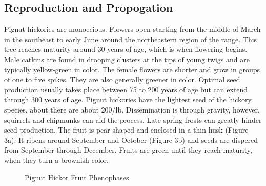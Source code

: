 \documentclass{article}\usepackage[]{graphicx}\usepackage[]{color}
\begin{document}
\subsection*{Reproduction and Propogation}
Pignut hickories are monoecious. Flowers open starting from the middle of March in the southeast to early June around the northeastern region of the range. This tree reaches maturity around 30 years of age, which is when flowering begins. Male catkins are found in drooping clusters at the tips of young twigs and are typically yellow-green in color. The female flowers are shorter and grow in groups of one to five spikes. They are also generally greener in color. Optimal seed production usually takes place between 75 to 200 years of age but can extend through 300 years of age. Pignut hickories have the lightest seed of the hickory species, about there are about 200/lb. Dissemination is through gravity, however, squirrels and chipmunks can aid the process. Late spring frosts can greatly hinder seed production. The fruit is pear shaped and enclosed in a thin husk (Figure 3a). It ripens around September and October (Figure 3b) and seeds are dispered from September through December. Fruits are green until they reach maturity, when they turn a brownish color. 
\begin{figure}[ht]%
    \centering
    \qquad
    \caption{Pignut Hickor Fruit Phenophases}%
    \label{fig:fruit}%
\end{figure}
\newpage
\end{document}
